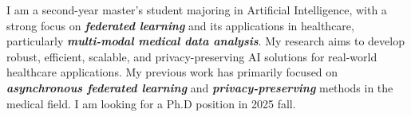 

\begin{cvparagraph}


I am a second-year master's student majoring in Artificial Intelligence, 
with a strong focus on \textit{\textbf{federated learning}} and its applications in healthcare, 
particularly \textit{\textbf{multi-modal medical data analysis}}. 
My research aims to develop robust, efficient, scalable, and privacy-preserving AI solutions for real-world healthcare applications. 
My previous work has primarily focused on \textit{\textbf{asynchronous federated learning}} and \textit{\textbf{privacy-preserving}} methods in the medical field. 
I am looking for a Ph.D position in 2025 fall.


\end{cvparagraph}
